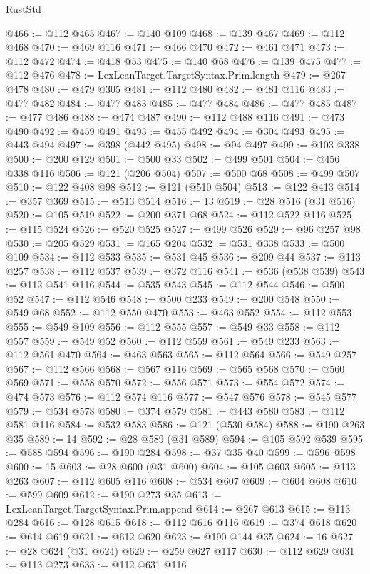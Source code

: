 \begin{lexlean}{RustStd}
\begin{coremodule}
@466 := @112 @465
@467 := @140 @109
@468 := @139 @467
@469 := @112 @468
@470 := @469 @116
@471 := @466 @470
@472 := @461 @471
@473 := @112 @472
@474 := @418 @53
@475 := @140 @68
@476 := @139 @475
@477 := @112 @476
@478 := LexLeanTarget.TargetSyntax.Prim.length
@479 := @267 @478
@480 := @479 @305
@481 := @112 @480
@482 := @481 @116
@483 := @477 @482
@484 := @477 @483
@485 := @477 @484
@486 := @477 @485
@487 := @477 @486
@488 := @474 @487
@490 := @112 @488 @116
@491 := @473 @490
@492 := @459 @491
@493 := @455 @492
@494 := @304 @493
@495 := @443 @494
@497 := @398 (@442 @495)
@498 := @94 @497
@499 := @103 @338
@500 := @200 @129
@501 := @500 @33
@502 := @499 @501
@504 := @456 @338 @116
@506 := @121 (@206 @504)
@507 := @500 @68
@508 := @499 @507
@510 := @122 @408 @98
@512 := @121 (@510 @504)
@513 := @122 @413
@514 := @357 @369
@515 := @513 @514
@516 := 13
@519 := @28 @516 (@31 @516)
@520 := @105 @519
@522 := @200 @371 @68
@524 := @112 @522 @116
@525 := @115 @524
@526 := @520 @525
@527 := @499 @526
@529 := @96 @257 @98
@530 := @205 @529
@531 := @165 @204
@532 := @531 @338
@533 := @500 @109
@534 := @112 @533
@535 := @531 @45
@536 := @209 @44
@537 := @113 @257
@538 := @112 @537
@539 := @372 @116
@541 := @536 (@538 @539)
@543 := @112 @541 @116
@544 := @535 @543
@545 := @112 @544
@546 := @500 @52
@547 := @112 @546
@548 := @500 @233
@549 := @200 @548
@550 := @549 @68
@552 := @112 @550 @470
@553 := @463 @552
@554 := @112 @553
@555 := @549 @109
@556 := @112 @555
@557 := @549 @33
@558 := @112 @557
@559 := @549 @52
@560 := @112 @559
@561 := @549 @233
@563 := @112 @561 @470
@564 := @463 @563
@565 := @112 @564
@566 := @549 @257
@567 := @112 @566
@568 := @567 @116
@569 := @565 @568
@570 := @560 @569
@571 := @558 @570
@572 := @556 @571
@573 := @554 @572
@574 := @474 @573
@576 := @112 @574 @116
@577 := @547 @576
@578 := @545 @577
@579 := @534 @578
@580 := @374 @579
@581 := @443 @580
@583 := @112 @581 @116
@584 := @532 @583
@586 := @121 (@530 @584)
@588 := @190 @263 @35
@589 := 14
@592 := @28 @589 (@31 @589)
@594 := @105 @592 @539
@595 := @588 @594
@596 := @190 @284
@598 := @37 @35 @40
@599 := @596 @598
@600 := 15
@603 := @28 @600 (@31 @600)
@604 := @105 @603
@605 := @113 @263
@607 := @112 @605 @116
@608 := @534 @607
@609 := @604 @608
@610 := @599 @609
@612 := @190 @273 @35
@613 := LexLeanTarget.TargetSyntax.Prim.append
@614 := @267 @613
@615 := @113 @284
@616 := @128 @615
@618 := @112 @616 @116
@619 := @374 @618
@620 := @614 @619
@621 := @612 @620
@623 := @190 @144 @35
@624 := 16
@627 := @28 @624 (@31 @624)
@629 := @259 @627 @117
@630 := @112 @629
@631 := @113 @273
@633 := @112 @631 @116

\end{coremodule}
\end{lexlean}
